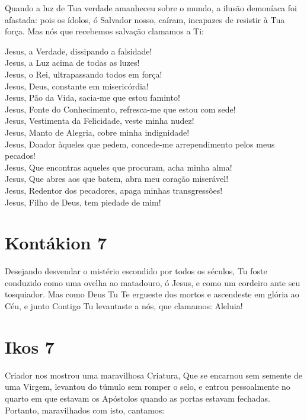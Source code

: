 \documentclass{subfiles}
\begin{document}
Quando a luz de Tua verdade amanheceu sobre o mundo, a ilusão
demoníaca foi afastada: pois os ídolos, ó Salvador nosso, caíram, incapazes de
resistir à Tua força. Mas nós que recebemos salvação clamamos a Ti:

Jesus, a Verdade, dissipando a falsidade! \\
Jesus, a Luz acima de todas as luzes! \\
Jesus, o Rei, ultrapassando todos em força! \\
Jesus, Deus, constante em misericórdia! \\
Jesus, Pão da Vida, sacia-me que estou faminto! \\
Jesus, Fonte do Conhecimento, refresca-me que estou com sede! \\
Jesus, Vestimenta da Felicidade, veste minha nudez! \\
Jesus, Manto de Alegria, cobre minha indignidade! \\
Jesus, Doador àqueles que pedem, concede-me arrependimento pelos meus pecados! \\
Jesus, Que encontras aqueles que procuram, acha minha alma! \\
Jesus, Que abres aos que batem, abra meu coração miserável! \\
Jesus, Redentor dos pecadores, apaga minhas transgressões! \\
Jesus, Filho de Deus, tem piedade de mim!

\section*{Kontákion 7}

Desejando desvendar o mistério escondido por todos os séculos, Tu
foste conduzido como uma ovelha ao matadouro, ó Jesus, e como um cordeiro
ante seu tosquiador. Mas como Deus Tu Te ergueste dos mortos e ascendeste
em glória ao Céu, e junto Contigo Tu levantaste a nós, que clamamos: Aleluia!

\section*{Ikos 7}

Criador nos mostrou uma maravilhosa Criatura, Que se encarnou sem
semente de uma Virgem, levantou do túmulo sem romper o selo, e entrou
pessoalmente no quarto em que estavam os Apóstolos quando as portas
estavam fechadas. Portanto, maravilhados com isto, cantamos:
\end{document}
